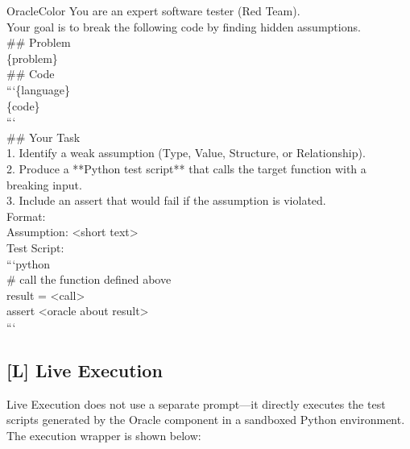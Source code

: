 \documentclass[11pt]{article}
\begin{document}
\begin{promptbox}[title={\textcolor{white}{[O] Oracle-based Assertion Prompt}}]{OracleColor}
\small\ttfamily
You are an expert software tester (Red Team).\\
Your goal is to break the following code by finding hidden assumptions.\\[0.5em]
\#\# Problem\\
\{problem\}\\[0.5em]
\#\# Code\\
```\{language\}\\
\{code\}\\
```\\[0.5em]
\#\# Your Task\\
1. Identify a weak assumption (Type, Value, Structure, or Relationship).\\
2. Produce a **Python test script** that calls the target function with a breaking input.\\
3. Include an assert that would fail if the assumption is violated.\\[0.5em]
Format:\\
Assumption: <short text>\\
Test Script:\\
```python\\
\# call the function defined above\\
result = <call>\\
assert <oracle about result>\\
```
\end{promptbox}

\subsection{[L] Live Execution}

Live Execution does not use a separate prompt---it directly executes the test scripts generated by the Oracle component in a sandboxed Python environment. The execution wrapper is shown below:
\end{document}

